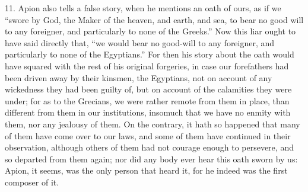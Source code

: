 11. Apion also tells a false story, when he mentions an oath of ours, as
if we ``swore by God, the Maker of the heaven, and earth, and sea, to bear
no good will to any foreigner, and particularly to none of the Greeks.''
Now this liar ought to have said directly that, ``we would bear no
good-will to any foreigner, and particularly to none of the Egyptians.''
For then his story about the oath would have squared with the rest of his
original forgeries, in case our forefathers had been driven away by their
kinsmen, the Egyptians, not on account of any wickedness they had been
guilty of, but on account of the calamities they were under; for as to the
Grecians, we were rather remote from them in place, than different from
them in our institutions, insomuch that we have no enmity with them, nor
any jealousy of them. On the contrary, it hath so happened that many of
them have come over to our laws, and some of them have continued in their
observation, although others of them had not courage enough to persevere,
and so departed from them again; nor did any body ever hear this oath
sworn by us: Apion, it seems, was the only person that heard it, for he
indeed was the first composer of it.

